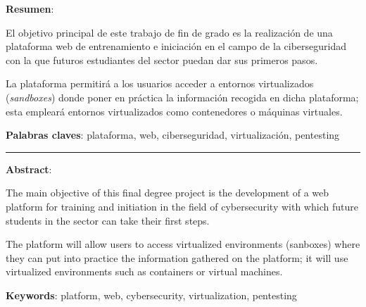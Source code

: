 \textbf{Resumen}:

El objetivo principal de este trabajo de fin de grado es la realización de una plataforma web de entrenamiento e iniciación en el campo de la ciberseguridad con la que futuros estudiantes del sector puedan dar sus primeros pasos.

La plataforma permitirá a los usuarios acceder a entornos virtualizados (\textit{sandboxes}) donde poner en práctica la información recogida en dicha plataforma; esta empleará entornos virtualizados como contenedores o máquinas virtuales.


\vspace{1cm}

\textbf{Palabras claves}: plataforma, web, ciberseguridad, virtualización, pentesting


\vspace{1cm}

\begin{center}
    \rule{0.5\textwidth}{0.5 pt}
\end{center}

\vspace{1cm}


\textbf{Abstract}:

The main objective of this final degree project is the development of a web platform for training and initiation in the field of cybersecurity with which future students in the sector can take their first steps.

The platform will allow users to access virtualized environments (sanboxes) where they can put into practice the information gathered on the platform; it will use virtualized environments such as containers or virtual machines.

\vspace{1cm}

\textbf{Keywords}: platform, web, cybersecurity, virtualization, pentesting
